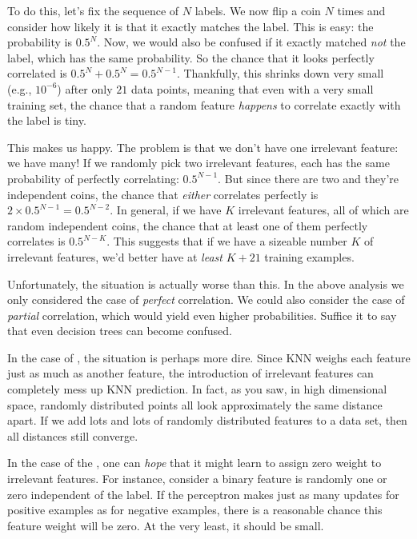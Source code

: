 To do this, let's fix the sequence of $N$ labels.  We now flip a coin
$N$ times and consider how likely it is that it exactly matches the
label.  This is easy: the probability is $0.5^N$.  Now, we would also
be confused if it exactly matched \emph{not} the label, which has the
same probability.  So the chance that it looks perfectly correlated is
$0.5^N + 0.5^N = 0.5^{N-1}$.  Thankfully, this shrinks down very small
(e.g., $10^{-6}$) after only $21$ data points, meaning that even with a very small training set, the chance that a random feature \emph{happens} to correlate exactly with the label is tiny.

This makes us happy.  The problem is that we don't have one irrelevant
feature: we have many! If we randomly pick
two irrelevant features, each has the same probability of
perfectly correlating: $0.5^{N-1}$.  But since there are two and
they're independent coins, the chance that \emph{either} correlates
perfectly is $2 \times 0.5^{N-1} = 0.5^{N-2}$.  In general, if we have
$K$ irrelevant features, all of which are random independent coins,
the chance that at least one of them perfectly correlates is
$0.5^{N-K}$.  This suggests that if we have a sizeable number $K$ of
irrelevant features, we'd better have at \emph{least} $K+21$ training
examples.

Unfortunately, the situation is actually worse than this.  In the
above analysis we only considered the case of \emph{perfect}
correlation.  We could also consider the case of \emph{partial}
correlation, which would yield even higher probabilities.
Suffice it to say that even
decision trees can become confused.


In the case of , the situation is
perhaps more dire.  Since KNN weighs each feature just as much as
another feature, the introduction of irrelevant features can
completely mess up KNN prediction.  In fact, as you saw, in high
dimensional space, randomly distributed points all look approximately
the same distance apart.  If we add lots and lots of randomly
distributed features to a data set, then all distances still
converge.

In the case of the , one can \emph{hope} that it
might learn to assign zero weight to irrelevant features.  For
instance, consider a binary feature is randomly one or zero
independent of the label.  If the perceptron makes just as many
updates for positive examples as for negative examples, there is a
reasonable chance this feature weight will be zero.  At the very
least, it should be small.

